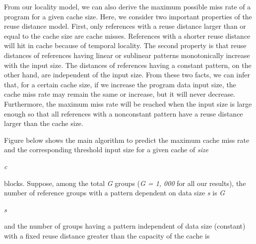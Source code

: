 \documentclass[12pt]{article}
\begin{document}
\vspace{\baselineskip}
\begin{adjustwidth}{0.0in}{0.01in}
{\fontsize{10pt}{12.0pt}\selectfont \textcolor[HTML]{333333}{From our locality model, we can also derive the maximum possible miss rate of a program for a given cache size. Here, we consider two important properties of the reuse distance model. First, only references with a reuse distance larger than or equal to the cache size are cache misses. References with a shorter reuse distance will hit in cache because of temporal locality. The second property is that reuse distances of references having linear or sublinear patterns monotonically increase with the input size. The distances of references having a constant pattern, on the other hand, are independent of the input size. From these two facts, we can infer that, for a certain cache size, if we increase the program data input size, the cache miss rate may remain the same or increase, but it will never decrease. Furthermore, the maximum miss rate will be reached when the input size is large enough so that all references with a nonconstant pattern have a reuse distance larger than the cache size.}\par}\par

\end{adjustwidth}


\vspace{\baselineskip}
\begin{adjustwidth}{0.0in}{0.04in}
{\fontsize{11pt}{13.2pt}\selectfont \textcolor[HTML]{333333}{Figure below shows the main algorithm to predict the maximum cache miss rate and the corresponding threshold input size for a given cache of \textit{size}}{\fontsize{7pt}{8.4pt}\selectfont \textit{\textcolor[HTML]{333333}{c}}{\fontsize{11pt}{13.2pt}\selectfont \textcolor[HTML]{333333}{ blocks. Suppose, among the total \textit{G} groups (\textit{G = 1, 000} for all our results), the number of reference groups with a pattern dependent on data size \textit{s} is \textit{G}}{\fontsize{7pt}{8.4pt}\selectfont \textit{\textcolor[HTML]{333333}{s}}{\fontsize{11pt}{13.2pt}\selectfont \textcolor[HTML]{333333}{ and the number of groups having a pattern independent of data size (constant) with a fixed reuse distance greater than the capacity of the cache is}\par}\par}\par}\par}\par}\par

\end{adjustwidth}
\end{document}
